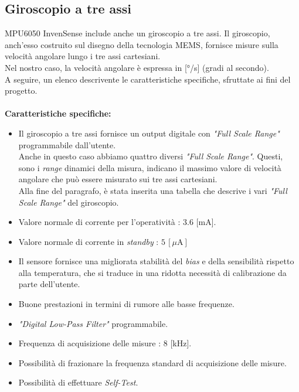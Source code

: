 \subsection{Giroscopio a tre assi}
MPU6050 InvenSense include anche un giroscopio a tre assi. Il giroscopio, anch'esso costruito sul disegno della tecnologia MEMS, fornisce misure sulla velocità angolare lungo i tre assi cartesiani.\\
Nel nostro caso, la velocità angolare è espressa in [°/s] (gradi al secondo).\\
A seguire, un elenco descrivente le caratteristiche specifiche, sfruttate ai fini del progetto.\\\\
\textbf{Caratteristiche specifiche:}
\begin{itemize}
\item Il giroscopio a tre assi fornisce un output digitale con \textit{"Full Scale Range"} programmabile dall'utente.\\Anche in questo caso abbiamo quattro diversi \textit{"Full Scale Range"}. Questi, sono i \textit{range} dinamici della misura, indicano il massimo valore di velocità angolare che può essere misurato sui tre assi cartesiani.\\Alla fine del paragrafo, è stata inserita una tabella che descrive i vari \textit{"Full Scale Range"} del giroscopio.
\item Valore normale di corrente per l'operatività : 3.6 [mA].
\item Valore normale di corrente in \textit{standby} : $5\,[\mu\text{A}]$
\item Il sensore fornisce una migliorata stabilità del \textit{bias} e della sensibilità rispetto alla temperatura, che si traduce in una ridotta necessità di calibrazione da parte dell'utente.
\item Buone prestazioni in termini di rumore alle basse frequenze.
\item \textit{"Digital Low-Pass Filter"} programmabile.
\item Frequenza di acquisizione delle misure : 8 [kHz].
\item Possibilità di frazionare la frequenza standard di acquisizione delle misure.
\item Possibilità di effettuare \textit{Self-Test}.
\end{itemize}

